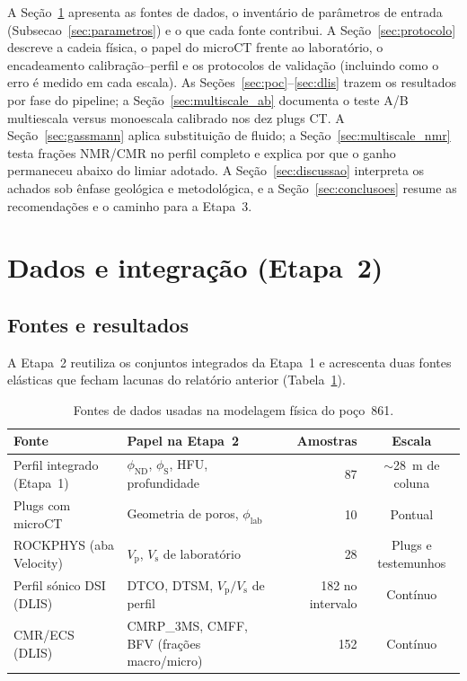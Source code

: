 \documentclass[11pt,a4paper]{article}
\numberwithin{equation}{section}
\newcommand{\philab}{\ensuremath{\phi_{\mathrm{lab}}}}
\newcommand{\phiND}{\ensuremath{\phi_{\mathrm{ND}}}}
\newcommand{\phiS}{\ensuremath{\phi_{\mathrm{S}}}}
\newcommand{\Vp}{\ensuremath{V_{\mathrm{p}}}}
\newcommand{\Vs}{\ensuremath{V_{\mathrm{s}}}}
\newcommand{\VpVs}{\ensuremath{V_{\mathrm{p}}/V_{\mathrm{s}}}}
\begin{document}
A Seção~\ref{sec:dados} apresenta as fontes de dados, o inventário de
parâmetros de entrada (Subsecao~\ref{sec:parametros}) e o que cada fonte
contribui.
A Seção~\ref{sec:protocolo} descreve a cadeia física, o papel do microCT
frente ao laboratório, o encadeamento calibração--perfil e os protocolos de
validação (incluindo como o erro é medido em cada escala).
As Seções~\ref{sec:poc}--\ref{sec:dlis} trazem os resultados por fase do
pipeline; a Seção~\ref{sec:multiscale_ab} documenta o teste A/B multiescala
versus monoescala calibrado nos dez plugs CT.
A Seção~\ref{sec:gassmann} aplica substituição de fluido; a
Seção~\ref{sec:multiscale_nmr} testa frações NMR/CMR no perfil completo e
explica por que o ganho permaneceu abaixo do limiar adotado.
A Seção~\ref{sec:discussao} interpreta os achados sob ênfase
geológica e metodológica, e a Seção~\ref{sec:conclusoes} resume as
recomendações e o caminho para a Etapa~3.

\section{Dados e integração (Etapa~2)}
\label{sec:dados}

\subsection{Fontes e resultados}

A Etapa~2 reutiliza os conjuntos integrados da Etapa~1 e acrescenta duas
fontes elásticas que fecham lacunas do relatório anterior
(Tabela~\ref{tab:fontes}).

\begin{table}[H]
  \centering
  \caption{Fontes de dados usadas na modelagem física do poço~861.}
  \label{tab:fontes}
  \small
  \begin{tabular}{p{3.2cm}p{4.8cm}rc}
    \toprule
    Fonte & Papel na Etapa~2 & Amostras & Escala \\
    \midrule
    Perfil integrado (Etapa~1)
      & \phiND{}, \phiS{}, HFU, profundidade & 87 & $\sim$28~m de coluna \\
    Plugs com microCT
      & Geometria de poros, \philab{} & 10 & Pontual \\
    ROCKPHYS (aba Velocity)
      & \Vp{}, \Vs{} de laboratório & 28 & Plugs e testemunhos \\
    Perfil sónico DSI (DLIS)
      & DTCO, DTSM, \VpVs{} de perfil & 182 no intervalo & Contínuo \\
    CMR/ECS (DLIS)
      & CMRP\_3MS, CMFF, BFV (frações macro/micro) & 152 & Contínuo \\
    \bottomrule
  \end{tabular}
\end{table}
\end{document}
